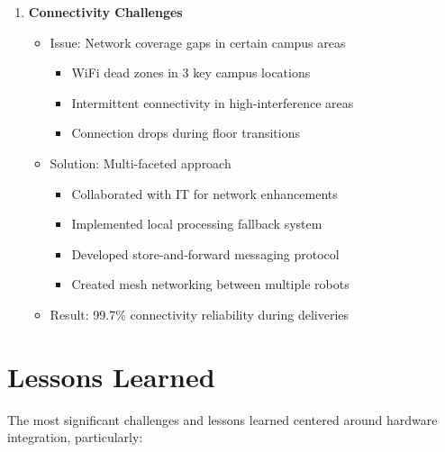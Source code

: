 \documentclass[12pt]{article}
\begin{document}
\begin{enumerate}
    \item \textbf{Connectivity Challenges}
    \begin{itemize}
        \item Issue: Network coverage gaps in certain campus areas
        \begin{itemize}
            \item WiFi dead zones in 3 key campus locations
            \item Intermittent connectivity in high-interference areas
            \item Connection drops during floor transitions
        \end{itemize}
        \item Solution: Multi-faceted approach
        \begin{itemize}
            \item Collaborated with IT for network enhancements
            \item Implemented local processing fallback system
            \item Developed store-and-forward messaging protocol
            \item Created mesh networking between multiple robots
        \end{itemize}
        \item Result: 99.7\% connectivity reliability during deliveries
    \end{itemize}
\end{enumerate}

\section{Lessons Learned}

The most significant challenges and lessons learned centered around hardware integration, particularly:
\end{document}
